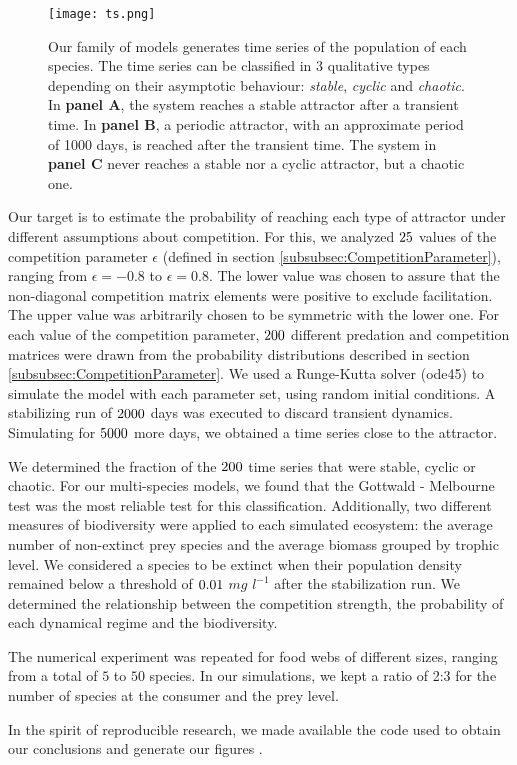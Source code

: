 \begin{figure}
	\begin{center}
		\texttt{[image: ts.png]}
	\end{center}
	\caption{Our family of models generates time series of the population of each species. The time series can be classified in $3$ qualitative types depending on their asymptotic behaviour: \textit{stable}, \textit{cyclic} and \textit{chaotic}. In \textbf{panel A}, the system reaches a stable attractor after a transient time. In \textbf{panel B}, a periodic attractor, with an approximate period of 1000 days, is reached after the transient time. The system in \textbf{panel C} never reaches a stable nor a cyclic attractor, but a chaotic one.}
	\label{fig:TimeSeries}
\end{figure}

Our target is to estimate the probability of reaching each type of attractor under different assumptions about competition. For this, we analyzed $25$ values of the competition parameter $\epsilon$ (defined in section \ref{subsubsec:CompetitionParameter}), ranging from $\epsilon = -0.8$ to $\epsilon = 0.8$. The lower value was chosen to assure that the non-diagonal competition matrix elements were positive to exclude facilitation. The upper value was arbitrarily chosen to be symmetric with the lower one. For each value of the competition parameter, $200$ different predation and competition matrices were drawn from the probability distributions described in section \ref{subsubsec:CompetitionParameter}. We used a Runge-Kutta solver (ode45) to simulate the model with each parameter set, using random initial conditions. A stabilizing run of $ 2000 $ days was executed to discard transient dynamics. Simulating for $ 5000 $ more days, we obtained a time series close to the attractor.

We determined the fraction of the $200$ time series that were stable, cyclic or chaotic.  For our multi-species models, we found that the Gottwald - Melbourne test \citep{Gottwald2009} was the most reliable test for this classification.  Additionally, two different measures of biodiversity were applied to each simulated ecosystem: the average number of non-extinct prey species and the average biomass grouped by trophic level. We considered a species to be extinct when their population density remained below a threshold of $0.01$ $mg$ $l^{-1}$ after the stabilization run. We determined the relationship between the competition strength, the probability of each dynamical regime and the biodiversity.

The numerical experiment was repeated for food webs of different sizes, ranging from a total of $5$ to $50$ species. In our simulations, we kept a ratio of 2:3 for the number of species at the consumer and the prey level.

In the spirit of reproducible research, we made available the code used to obtain our conclusions and generate our figures \citep{Rodriguez-Sanchez-code-neuchaos}.